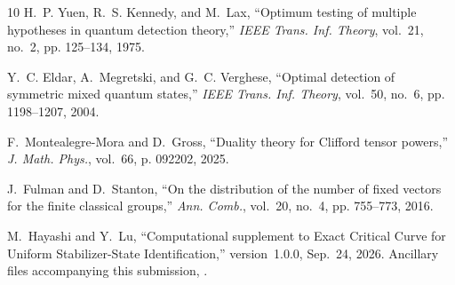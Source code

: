 \documentclass[journal,twocolumn]{IEEEtran}
\theoremstyle{definition}
\theoremstyle{plain}
\begin{document}
\begin{thebibliography}{10}
H.~P. Yuen, R.~S. Kennedy, and M.~Lax, ``Optimum testing of multiple hypotheses in quantum detection theory,'' \emph{IEEE Trans. Inf. Theory}, vol.~21, no.~2, pp. 125--134, 1975.

Y.~C. Eldar, A.~Megretski, and G.~C. Verghese, ``Optimal detection of symmetric mixed quantum states,'' \emph{IEEE Trans. Inf. Theory}, vol.~50, no.~6, pp. 1198--1207, 2004.

F.~Montealegre-Mora and D.~Gross, ``Duality theory for {Clifford} tensor powers,'' \emph{J. Math. Phys.}, vol.~66, p. 092202, 2025.

J.~Fulman and D.~Stanton, ``On the distribution of the number of fixed vectors for the finite classical groups,'' \emph{Ann. Comb.}, vol.~20, no.~4, pp. 755--773, 2016.

M.~Hayashi and Y.~Lu, ``Computational supplement to Exact Critical Curve
for Uniform Stabilizer-State Identification,'' version~1.0.0,
Sep.~24, 2026. Ancillary files accompanying this submission,
.

\end{thebibliography}
\end{document}
